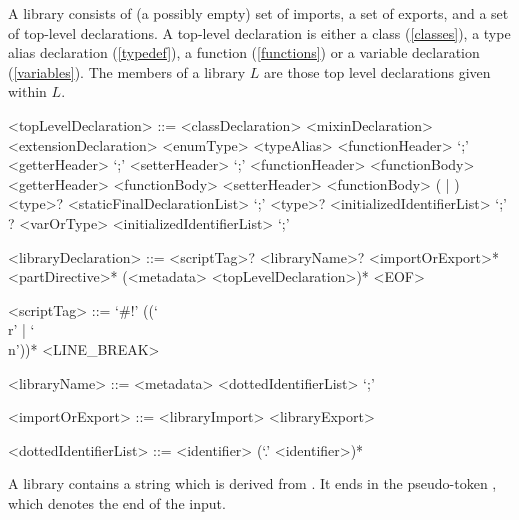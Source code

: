 \documentclass[makeidx]{article}
\begin{document}
\LMHash{}%
A library consists of (a possibly empty) set of imports, a set of exports,
and a set of top-level declarations.
A top-level declaration is either a class (\ref{classes}),
a type alias declaration (\ref{typedef}),
a function (\ref{functions})
or a variable declaration (\ref{variables}).
The members of a library $L$ are those top level declarations given within $L$.

\begin{grammar}
<topLevelDeclaration> ::= <classDeclaration>
  \alt <mixinDeclaration>
  \alt <extensionDeclaration>
  \alt <enumType>
  \alt <typeAlias>
  \alt \EXTERNAL{} <functionHeader> `;'
  \alt \EXTERNAL{} <getterHeader> `;'
  \alt \EXTERNAL{} <setterHeader> `;'
  \alt <functionHeader> <functionBody>
  \alt <getterHeader> <functionBody>
  \alt <setterHeader> <functionBody>
  \alt (\FINAL{} | \CONST{}) <type>? <staticFinalDeclarationList> `;'
  \alt \LATE{} \FINAL{} <type>? <initializedIdentifierList> `;'
  \alt \LATE? <varOrType> <initializedIdentifierList> `;'

<libraryDeclaration> ::= \gnewline{}
  <scriptTag>? <libraryName>? <importOrExport>* <partDirective>*
  \gnewline{} (<metadata> <topLevelDeclaration>)* <EOF>

<scriptTag> ::= `#!' (\gtilde(`\\r' | `\\n'))* <LINE\_BREAK>

<libraryName> ::= <metadata> \LIBRARY{} <dottedIdentifierList> `;'

<importOrExport> ::= <libraryImport>
  \alt <libraryExport>

<dottedIdentifierList> ::= <identifier> (`.' <identifier>)*
\end{grammar}

\LMHash{}%
A library contains a string which is derived from .
It ends in the pseudo-token
,
which denotes the end of the input.

\end{document}
